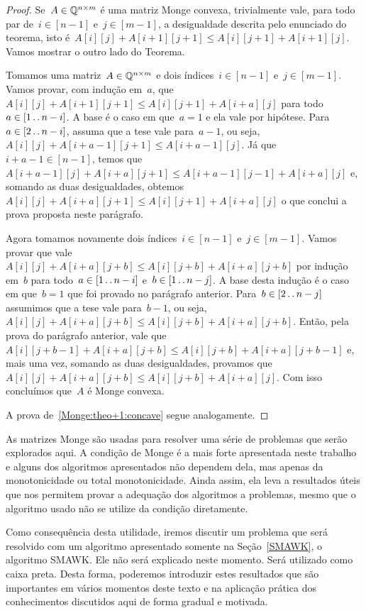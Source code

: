 \begin{proof}
Se~$A \in \mathbb{Q}^{n \times m}$ é uma matriz Monge convexa, trivialmente vale, para todo par de~${ i \in [n-1] }$ e~${ j \in [m-1] }$, a desigualdade descrita pelo enunciado do teorema, isto é~${ A[i][j] + A[i+1][j+1] \leq A[i][j+1] + A[i+1][j] }$. Vamos mostrar o outro lado do Teorema.

Tomamos uma matriz~$A \in \mathbb{Q}^{n \times m}$ e dois índices~${ i \in [n-1] }$ e~${ j \in [m-1] }$. Vamos provar, com indução em~$a$, que~${ A[i][j] + A[i+1][j+1] \leq A[i][j+1] + A[i+a][j] }$ para todo~${ a \in [1 \,.\,.\, n-i ] }$. A base é o caso em que~${ a = 1 }$ e ela vale por hipótese. Para~${ a \in [2 \,.\,.\, n-i] }$, assuma que a tese vale para~${ a-1 }$, ou seja,~${ A[i][j] + A[i + a - 1][j+1] \leq A[i + a - 1][j] }$. Já que~${ i + a - 1  \in [n-1] }$, temos que~${ A[i+a-1][j] + A[i+a][j+1] \leq A[i+a-1][j-1] + A[i+a][j] }$ e, somando as duas desigualdades, obtemos~${ A[i][j] + A[i+a][j+1] \leq A[i][j+1] + A[i+a][j] }$ o que conclui a prova proposta neste parágrafo.

Agora tomamos novamente dois índices~${ i \in [n-1] }$ e~${ j \in [m-1] }$. Vamos provar que vale~${ A[i][j] + A[i+a][j+b] \leq A[i][j+b] + A[i+a][j+b] }$ por indução em~$b$ para todo~${ a \in [1 \,.\,.\, n-i] }$ e~${ b \in [1 \,.\,.\, n-j] }$. A base desta indução é o caso em que~${ b = 1 }$ que foi provado no parágrafo anterior. Para~${ b \in [2 \,.\,.\, n-j] }$ assumimos que a tese vale para~${ b-1 }$, ou seja,~${ A[i][j] + A[i+a][j+b] \leq A[i][j+b] + A[i+a][j+b] }$. Então, pela prova do parágrafo anterior, vale que~${ A[i][j + b - 1] + A[i+a][j+b] \leq A[i][j+b] + A[i+a][j+b-1] }$ e, mais uma vez, somando as duas desigualdades, provamos que~${ A[i][j] + A[i+a][j+b] \leq A[i][j+b] + A[i+a][j] }$. Com isso concluímos que~$A$ é Monge convexa.

A prova de~\ref{Monge:theo+1:concave} segue analogamente.
\end{proof}

As matrizes Monge são usadas para resolver uma série de problemas que serão explorados aqui. A condição de Monge é a mais forte apresentada neste trabalho e alguns dos algoritmos apresentados não dependem dela, mas apenas da monotonicidade ou total monotonicidade. Ainda assim, ela leva a resultados úteis que nos permitem provar a adequação dos algoritmos a problemas, mesmo que o algoritmo usado não se utilize da condição diretamente.  

Como consequência desta utilidade, iremos discutir um problema que será resolvido com um algoritmo apresentado somente na Seção~\ref{SMAWK}, o algoritmo SMAWK. Ele não será explicado neste momento. Será utilizado como caixa preta. Desta forma, poderemos introduzir estes resultados que são importantes em vários momentos deste texto e na aplicação prática dos conhecimentos discutidos aqui de forma gradual e motivada.   

